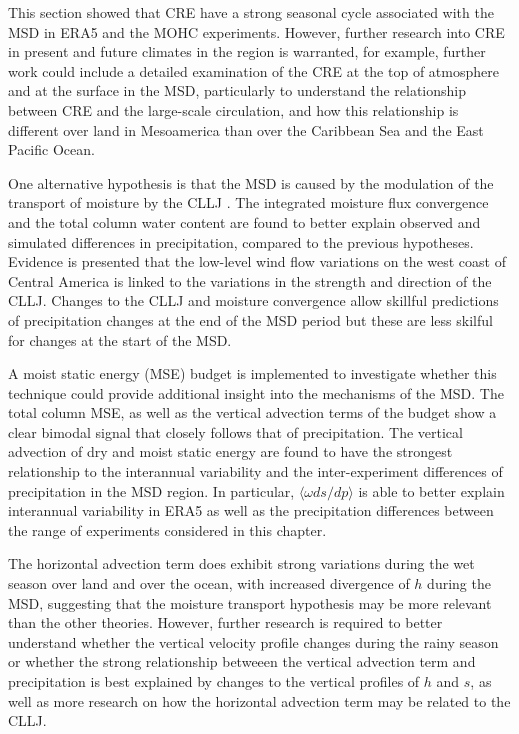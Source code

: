 This section showed that CRE have a strong seasonal cycle associated with the MSD in ERA5 and the MOHC experiments. However, further research into CRE in present and future climates in the region is warranted, for example, further work could include a detailed examination of the CRE at the top of atmosphere and at the surface in the MSD, particularly to understand the relationship between CRE and the large-scale circulation, and how this relationship is different over land in Mesoamerica than over the Caribbean Sea and the East Pacific Ocean.

One alternative hypothesis is that the MSD is caused by the modulation of the transport of moisture by the CLLJ \citep{herrera2015,zermeno2019,martinez2019}. The integrated moisture flux convergence and the total column water content are found to better explain observed and simulated differences in precipitation, compared to the previous hypotheses. Evidence is presented that the low-level wind flow variations on the west coast of Central America is linked to the variations in the strength and direction of the CLLJ. 
Changes to the CLLJ and moisture convergence allow skillful predictions of precipitation changes at the end of the MSD period but these are less skilful for changes at the start of the MSD. 


A moist static energy (MSE) budget is implemented to investigate whether this technique could provide additional insight into the mechanisms of the MSD. The total column MSE, as well as the vertical advection terms of the budget show a clear bimodal signal that closely follows that of precipitation. The vertical advection of dry and moist static energy are found to have the strongest relationship to the interannual variability and the inter-experiment differences of precipitation in the MSD region. 
In particular, $\langle \omega ds/dp \rangle$ is able to better explain interannual variability in ERA5 as well as the precipitation differences between the range of experiments considered in this chapter. 

The horizontal advection term does exhibit strong variations during the wet season over land and over the ocean, with increased divergence of $h$ during the MSD, suggesting that the moisture transport hypothesis may be more relevant than the other theories. 
However, further research is required to better understand whether the vertical velocity profile changes during the rainy season or whether the strong relationship betweeen the vertical advection term and precipitation is best explained by changes to the vertical profiles of $h$ and $s$, as well as more research on how the horizontal advection term may be related to the CLLJ.
 
